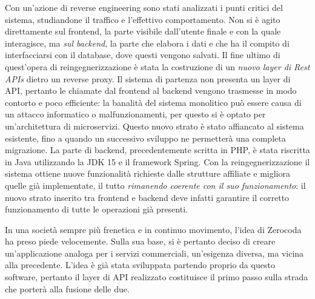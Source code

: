 \documentclass[
    corpo=11pt,
    twoside,
]{toptesi}
\begin{document}
Con un'azione di reverse engineering sono stati analizzati i punti critici del sistema, studiandone il traffico e l'effettivo comportamento. Non si è agito direttamente sul frontend, la parte visibile dall'utente finale e con la quale interagisce, ma \textit{sul backend}, la parte che elabora i dati e che ha il compito di interfacciarsi con il database, dove questi vengono salvati. Il fine ultimo di quest'opera di reingegnerizzazione è stata la costruzione di un \emph{nuovo layer di Rest APIs} dietro un reverse proxy. Il sistema di partenza non presenta un layer di API, pertanto le chiamate dal frontend al backend vengono trasmesse in modo contorto e poco efficiente: la banalità del sistema monolitico può essere causa di un attacco informatico o malfunzionamenti, per questo si è optato per un'architettura di microservizi. Questo nuovo strato è stato affiancato al sistema esistente, fino a quando un successivo sviluppo ne permetterà una completa migrazione. La parte di backend, precedentemente scritta in PHP, è stata riscritta in Java utilizzando la JDK 15 e il framework Spring. Con la reingegnerizzazione il sistema ottiene nuove funzionalità richieste dalle strutture affiliate e migliora quelle già implementate, il tutto \emph{rimanendo coerente con il suo funzionamento}: il nuovo strato inserito tra frontend e backend deve infatti garantire il corretto funzionamento di tutte le operazioni già presenti.

In una società sempre più frenetica e in continuo movimento, l'idea di Zerocoda ha preso piede velocemente. Sulla sua base, si è pertanto deciso di creare un'applicazione analoga per i servizi commerciali, un'esigenza  diversa, ma vicina alla precedente. L'idea è già stata sviluppata partendo proprio da questo software, pertanto il layer di API realizzato costituisce il primo passo sulla strada che porterà alla fusione delle due.


\tableofcontents

\listoffigures



\mainmatter






{}
\nocite{*}
\printbibliography
\end{document}
